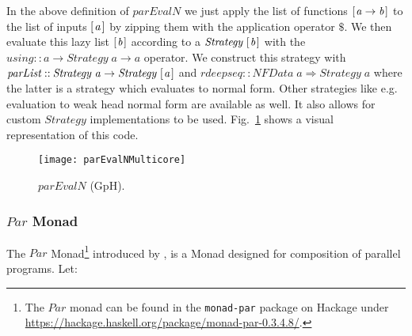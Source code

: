 \documentclass{jfp1}
\newcommand{\Conid}[1]{\mathit{#1}}
\newcommand{\Varid}[1]{\mathit{#1}}
\begin{document}
In the above definition of \ensuremath{\Varid{parEvalN}} we just apply the list of functions \ensuremath{[\mskip1.5mu \Varid{a}\to \Varid{b}\mskip1.5mu]} to the list of inputs \ensuremath{[\mskip1.5mu \Varid{a}\mskip1.5mu]} by zipping them with the application operator \ensuremath{\mathbin{\$}}. %
We then evaluate this lazy list \ensuremath{[\mskip1.5mu \Varid{b}\mskip1.5mu]} according to a \ensuremath{\Conid{Strategy}\;[\mskip1.5mu \Varid{b}\mskip1.5mu]} with the \ensuremath{\Varid{using}\mathbin{::}\Varid{a}\to \Conid{Strategy}\;\Varid{a}\to \Varid{a}} operator. We construct this strategy with \ensuremath{\Varid{parList}\mathbin{::}\Conid{Strategy}\;\Varid{a}\to \Conid{Strategy}\;[\mskip1.5mu \Varid{a}\mskip1.5mu]} and \ensuremath{\Varid{rdeepseq}\mathbin{::}\Conid{NFData}\;\Varid{a}\Rightarrow \Conid{Strategy}\;\Varid{a}} where the latter is a strategy which evaluates to normal form. Other strategies like e.g. evaluation to weak head normal form are available as well. It also allows for custom \ensuremath{\Conid{Strategy}} implementations to be used.
%
Fig.~\ref{fig:parEvalNMulticoreImg} shows a visual representation of this code.


\begin{figure}[t]
	\texttt{[image: parEvalNMulticore]}
	\caption{\ensuremath{\Varid{parEvalN}} (GpH).}
	\label{fig:parEvalNMulticoreImg}
\end{figure} %

\subsubsection{\ensuremath{\Conid{Par}} Monad}
The \ensuremath{\Conid{Par}} Monad\footnote{The \ensuremath{\Conid{Par}} monad can be found in the \texttt{monad-par} package on Hackage under \url{https://hackage.haskell.org/package/monad-par-0.3.4.8/}.} introduced by \citet{par-monad}, is a Monad designed for composition of parallel programs. Let:
\end{document}
